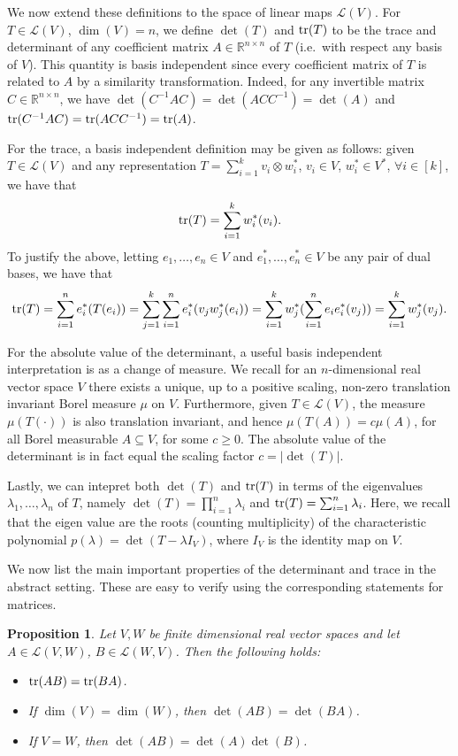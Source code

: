 \documentclass[11pt]{article}
\newtheorem{proposition}[theorem]{Proposition}
\theoremstyle{plain}
\theoremstyle{plain}
\newcommand{\R}{\ensuremath{\mathbb{R}}}
\begin{document}
We now extend these definitions to the space of linear maps $\mathcal{L}(V)$.
For $T \in \mathcal{L}(V)$, $\dim(V)=n$, we define $\det(T)$ and ${\rm tr}(T)$
to be the trace and determinant of any coefficient matrix $A \in \R^{n \times
n}$ of $T$ (i.e.~with respect any basis of $V$). This quantity is basis
independent since every coefficient matrix of $T$ is related to $A$ by a
similarity transformation. Indeed, for any invertible matrix $C \in \R^{n
\times n}$, we have $\det(C^{-1} A C) = \det(A C C^{-1}) = \det(A)$ and ${\rm
tr}(C^{-1} A C) = {\rm tr}(A C C^{-1}) = {\rm tr}(A)$. 

For the trace, a basis independent definition may be given as follows: given $T
\in \mathcal{L}(V)$ and any representation $T = \sum_{i=1}^k v_i \otimes w_i^*$,
$v_i \in V$, $w_i^* \in V^*$, $\forall i \in [k]$, we have that
\[
{\rm tr}(T) = \sum_{i=1}^k w_i^*(v_i).
\]
To justify the above, letting $e_1,\dots,e_n \in V$ and $e_1^*,\dots,e_n^* \in
V$ be any pair of dual bases, we have that
\[
{\rm tr}(T) = \sum_{i=1}^n e_i^*(T(e_i)) = \sum_{j=1}^k \sum_{i=1}^n e_i^*(v_j w_j^*(e_i)) 
            = \sum_{i=1}^k w_j^*(\sum_{i=1}^n e_i e_i^*(v_j)) 
            = \sum_{i=1}^k w_j^*(v_j).
\]

For the absolute value of the determinant, a useful basis independent
interpretation is as a change of measure. We recall for an $n$-dimensional real
vector space $V$ there exists a unique, up to a positive scaling, non-zero
translation invariant Borel measure $\mu$ on $V$. Furthermore, given $T \in
\mathcal{L}(V)$, the measure $\mu(T(\cdot))$ is also translation invariant, and
hence $\mu(T(A)) = c \mu(A)$, for all Borel measurable $A \subseteq V$, for some
$c \geq 0$. The absolute value of the determinant is in fact equal the scaling
factor $c = |\det(T)|$.

Lastly, we can intepret both $\det(T)$ and ${\rm tr}(T)$ in terms of the
eigenvalues $\lambda_1,\dots,\lambda_n$ of $T$, namely $\det(T) = \prod_{i=1}^n
\lambda_i$ and ${\rm tr}(T) = \sum_{i=1}^n \lambda_i$. Here, we recall that the
eigen value are the roots (counting multiplicity) of the characteristic
polynomial $p(\lambda) = \det(T-\lambda I_V)$, where $I_V$ is the identity map
on $V$.

We now list the main important properties of the determinant and trace in the
abstract setting. These are easy to verify using the corresponding statements
for matrices.

\begin{proposition}
\label{lem:tr-det-props}
Let $V,W$ be finite dimensional real vector spaces and let $A \in
\mathcal{L}(V,W)$, $B \in \mathcal{L}(W,V)$. Then the following holds:
\begin{itemize}
\item ${\rm tr}(AB) = {\rm tr}(BA)$.
\item If $\dim(V)=\dim(W)$, then $\det(AB) = \det(BA)$.  
\item If $V=W$, then $\det(AB) = \det(A)\det(B)$.
\end{itemize}
\end{proposition}
\end{document}
